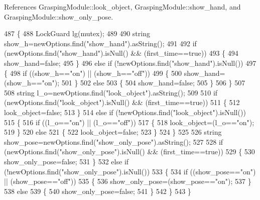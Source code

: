 References Grasping\+Module\+::look\+\_\+object, Grasping\+Module\+::show\+\_\+hand, and Grasping\+Module\+::show\+\_\+only\+\_\+pose.


\begin{DoxyCode}
487 \{
488     LockGuard lg(mutex);
489 
490     \textcolor{keywordtype}{string} show\_h=newOptions.find(\textcolor{stringliteral}{"show\_hand"}).asString();
491 
492     \textcolor{keywordflow}{if} (newOptions.find(\textcolor{stringliteral}{"show\_hand"}).isNull() && (first\_time==\textcolor{keyword}{true}))
493     \{
494         show_hand=\textcolor{keyword}{false};
495     \}
496     \textcolor{keywordflow}{else} \textcolor{keywordflow}{if} (!newOptions.find(\textcolor{stringliteral}{"show\_hand"}).isNull())
497     \{
498         \textcolor{keywordflow}{if} ((show\_h==\textcolor{stringliteral}{"on"}) || (show\_h==\textcolor{stringliteral}{"off"}))
499         \{
500             show_hand=(show\_h==\textcolor{stringliteral}{"on"});
501         \}
502         \textcolor{keywordflow}{else}
503         \{
504             show_hand=\textcolor{keyword}{false};
505         \}
506     \}
507 
508     \textcolor{keywordtype}{string} l\_o=newOptions.find(\textcolor{stringliteral}{"look\_object"}).asString();
509 
510     \textcolor{keywordflow}{if} (newOptions.find(\textcolor{stringliteral}{"look\_object"}).isNull() && (first\_time==\textcolor{keyword}{true}))
511     \{
512         look_object=\textcolor{keyword}{false};
513     \}
514     \textcolor{keywordflow}{else} \textcolor{keywordflow}{if} (!newOptions.find(\textcolor{stringliteral}{"look\_object"}).isNull())
515     \{
516         \textcolor{keywordflow}{if} ((l\_o==\textcolor{stringliteral}{"on"}) || (l\_o==\textcolor{stringliteral}{"off"}))
517         \{
518             look_object=(l\_o==\textcolor{stringliteral}{"on"});
519         \}
520         \textcolor{keywordflow}{else}
521         \{
522             look_object=\textcolor{keyword}{false};
523         \}
524     \}
525 
526     \textcolor{keywordtype}{string} show\_pose=newOptions.find(\textcolor{stringliteral}{"show\_only\_pose"}).asString();
527 
528     \textcolor{keywordflow}{if} (newOptions.find(\textcolor{stringliteral}{"show\_only\_pose"}).isNull() && (first\_time==\textcolor{keyword}{true}))
529     \{
530         show_only_pose=\textcolor{keyword}{false};
531     \}
532     \textcolor{keywordflow}{else} \textcolor{keywordflow}{if} (!newOptions.find(\textcolor{stringliteral}{"show\_only\_pose"}).isNull())
533     \{
534         \textcolor{keywordflow}{if} ((show\_pose==\textcolor{stringliteral}{"on"}) || (show\_pose==\textcolor{stringliteral}{"off"}))
535         \{
536             show_only_pose=(show\_pose==\textcolor{stringliteral}{"on"});
537         \}
538         \textcolor{keywordflow}{else}
539         \{
540             show_only_pose=\textcolor{keyword}{false};
541         \}
542     \}
543 \}
\end{DoxyCode}
